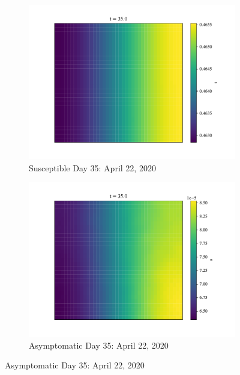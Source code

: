 \documentclass[11pt]{article}
\begin{document}
\begin{figure}[H]
			\begin{subfigure}{0.5\textwidth}
				\includegraphics[width=\textwidth]{susceptible_35}
				\caption{Susceptible Day 35: April 22, 2020}
			\end{subfigure}%
			\begin{subfigure}{0.5\textwidth}
				\includegraphics[width=\textwidth]{asymptomatic_35}
				\caption{Asymptomatic Day 35: April 22, 2020}
			\end{subfigure}
			

\end{figure}
\end{document}
